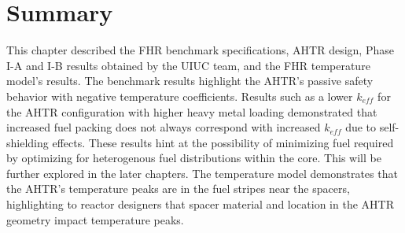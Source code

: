 \pagebreak
\section{Summary}
\glsresetall
This chapter described the \gls{FHR} benchmark specifications, \gls{AHTR} design,
Phase I-A and I-B results obtained by the \gls{UIUC} team, and the \gls{FHR} 
temperature model's results.  
The benchmark results highlight the \gls{AHTR}'s passive safety behavior with 
negative temperature coefficients. 
Results such as a lower $k_{eff}$ for the \gls{AHTR} configuration with 
higher heavy metal loading demonstrated that increased fuel packing does not always 
correspond with increased $k_{eff}$ due to self-shielding effects.
These results hint at the possibility of minimizing fuel required by optimizing 
for heterogenous fuel distributions within the core. 
This will be further explored in the later chapters. 
The temperature model demonstrates that the \gls{AHTR}'s temperature peaks are in the 
fuel stripes near the spacers, highlighting to reactor designers that 
spacer material and location in the \gls{AHTR} geometry impact temperature peaks. 
